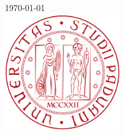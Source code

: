 \begin{titlepage}
{\large \today}\\[2cm]



\includegraphics[height=5cm]{Immagini/UniPd.png}\\[1cm]
 
\vfill 

\end{titlepage}